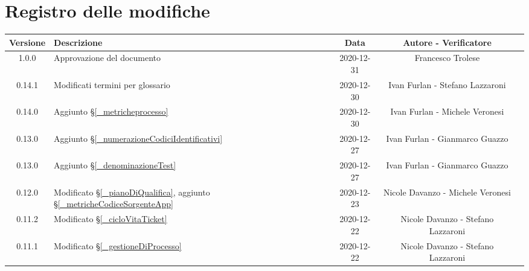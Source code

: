 \section*{Registro delle modifiche}

\begin{center}
	\begin{longtable}{|c|p{5cm}|c|c|c|}
		\hline
		\rowcolor{lighter-grayer}
		\textbf{Versione} & \textbf{Descrizione} & \textbf{Data} & \textbf{Autore - Verificatore} \\
		\hline
		\endfirsthead

		1.0.0 & Approvazione del documento & 2020-12-31 & Francesco Trolese \\
		0.14.1 & Modificati termini per glossario & 2020-12-30 & Ivan Furlan - Stefano Lazzaroni \\
		0.14.0 & Aggiunto \S\ref{_metricheprocesso} & 2020-12-30 & Ivan Furlan - Michele Veronesi \\
		0.13.0 & Aggiunto \S\ref{_numerazioneCodiciIdentificativi} & 2020-12-27 & Ivan Furlan - Gianmarco Guazzo \\
		0.13.0 & Aggiunto \S\ref{_denominazioneTest} & 2020-12-27 & Ivan Furlan - Gianmarco Guazzo  \\
		0.12.0 & Modificato \S\ref{_pianoDiQualifica}, aggiunto \S\ref{_metricheCodiceSorgenteApp} & 2020-12-23 & Nicole Davanzo - Michele Veronesi  \\
		
		0.11.2 & Modificato \S\ref{_cicloVitaTicket} & 2020-12-22& Nicole Davanzo - Stefano Lazzaroni  \\
		0.11.1 & Modificato \S\ref{_gestioneDiProcesso} & 2020-12-22 & Nicole Davanzo - Stefano Lazzaroni  \\


\end{longtable}
\end{center}
